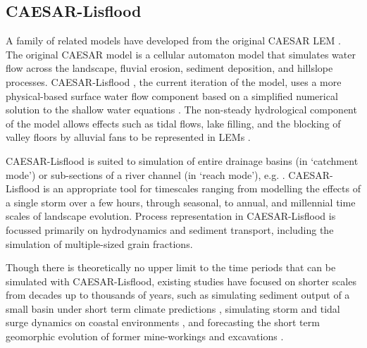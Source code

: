 \subsection{CAESAR-Lisflood}
A family of related models have developed from the original CAESAR LEM \citep{coulthard1996cellular,coulthard2002cellular}. The original CAESAR model is a cellular automaton model that simulates water flow across the landscape, fluvial erosion, sediment deposition, and hillslope processes. CAESAR-Lisflood \citep{Coulthard2013}, the current iteration of the model, uses a more physical-based surface water flow component based on a simplified numerical solution to the shallow water equations \citep[LISFLOOD-FP][]{bates2010simple}. The non-steady hydrological component of the model allows effects such as tidal flows, lake filling, and the blocking of valley floors by alluvial fans to be represented in LEMs \citep{Coulthard2013}. 

CAESAR-Lisflood is suited to simulation of entire drainage basins (in `catchment mode') or sub-sections of a river channel (in `reach mode'), e.g.  \citet{Coulthard2006,van2007embedding}. CAESAR-Lisflood is an appropriate tool for timescales ranging from modelling the effects of a single storm over a few hours, through seasonal, to annual, and millennial time scales of landscape evolution. Process representation in CAESAR-Lisflood is focussed primarily on hydrodynamics and sediment transport, including the simulation of multiple-sized grain fractions. 

Though there is theoretically no upper limit to the time periods that can be simulated with CAESAR-Lisflood, existing studies have focused on shorter scales from decades up to thousands of years, such as simulating sediment output of a small basin under short term climate predictions \citep{Coulthard2012a}, simulating storm and tidal surge dynamics on coastal environments \citep{Skinner2015}, and forecasting the short term geomorphic evolution of former mine-workings and excavations \citep{pasculli2015cellular}.


